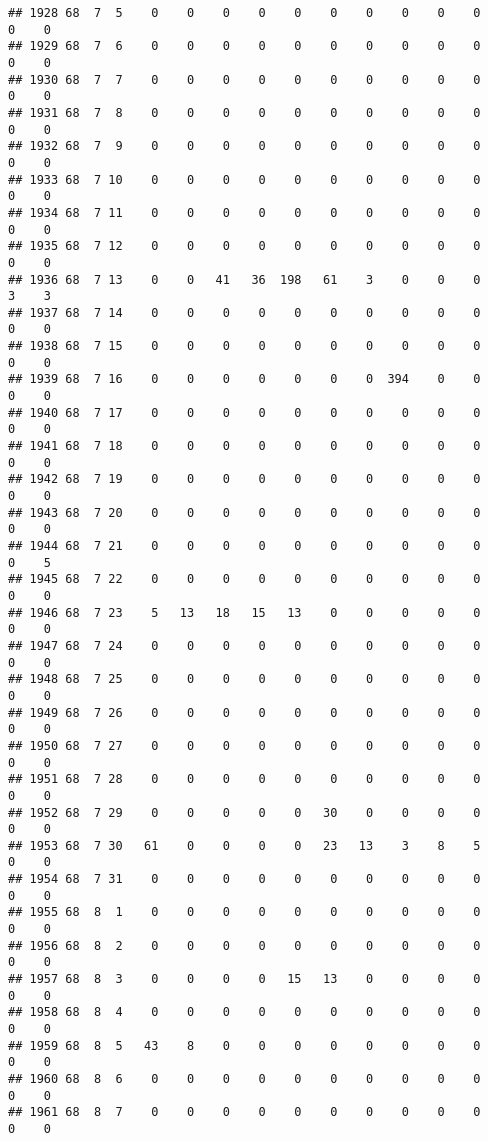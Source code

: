 \documentclass[]{article}
\begin{document}
\begin{verbatim}
## 1928 68  7  5    0    0    0    0    0    0    0    0    0    0    0    0
## 1929 68  7  6    0    0    0    0    0    0    0    0    0    0    0    0
## 1930 68  7  7    0    0    0    0    0    0    0    0    0    0    0    0
## 1931 68  7  8    0    0    0    0    0    0    0    0    0    0    0    0
## 1932 68  7  9    0    0    0    0    0    0    0    0    0    0    0    0
## 1933 68  7 10    0    0    0    0    0    0    0    0    0    0    0    0
## 1934 68  7 11    0    0    0    0    0    0    0    0    0    0    0    0
## 1935 68  7 12    0    0    0    0    0    0    0    0    0    0    0    0
## 1936 68  7 13    0    0   41   36  198   61    3    0    0    0    3    3
## 1937 68  7 14    0    0    0    0    0    0    0    0    0    0    0    0
## 1938 68  7 15    0    0    0    0    0    0    0    0    0    0    0    0
## 1939 68  7 16    0    0    0    0    0    0    0  394    0    0    0    0
## 1940 68  7 17    0    0    0    0    0    0    0    0    0    0    0    0
## 1941 68  7 18    0    0    0    0    0    0    0    0    0    0    0    0
## 1942 68  7 19    0    0    0    0    0    0    0    0    0    0    0    0
## 1943 68  7 20    0    0    0    0    0    0    0    0    0    0    0    0
## 1944 68  7 21    0    0    0    0    0    0    0    0    0    0    0    5
## 1945 68  7 22    0    0    0    0    0    0    0    0    0    0    0    0
## 1946 68  7 23    5   13   18   15   13    0    0    0    0    0    0    0
## 1947 68  7 24    0    0    0    0    0    0    0    0    0    0    0    0
## 1948 68  7 25    0    0    0    0    0    0    0    0    0    0    0    0
## 1949 68  7 26    0    0    0    0    0    0    0    0    0    0    0    0
## 1950 68  7 27    0    0    0    0    0    0    0    0    0    0    0    0
## 1951 68  7 28    0    0    0    0    0    0    0    0    0    0    0    0
## 1952 68  7 29    0    0    0    0    0   30    0    0    0    0    0    0
## 1953 68  7 30   61    0    0    0    0   23   13    3    8    5    0    0
## 1954 68  7 31    0    0    0    0    0    0    0    0    0    0    0    0
## 1955 68  8  1    0    0    0    0    0    0    0    0    0    0    0    0
## 1956 68  8  2    0    0    0    0    0    0    0    0    0    0    0    0
## 1957 68  8  3    0    0    0    0   15   13    0    0    0    0    0    0
## 1958 68  8  4    0    0    0    0    0    0    0    0    0    0    0    0
## 1959 68  8  5   43    8    0    0    0    0    0    0    0    0    0    0
## 1960 68  8  6    0    0    0    0    0    0    0    0    0    0    0    0
## 1961 68  8  7    0    0    0    0    0    0    0    0    0    0    0    0

\end{verbatim}
\end{document}
